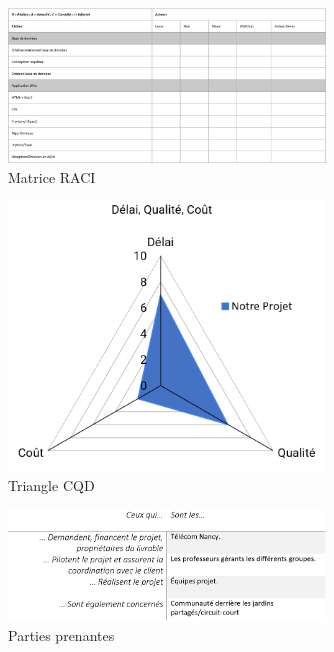 \documentclass[french,a4paper]{article}
\begin{document}
\begin{figure}[h]
    \centering
    \includegraphics[width=0.75\textwidth]{img/RACI.png}
    \caption{Matrice RACI}
    \label{fig:mesh1}
\end{figure}

\begin{figure}[h]
    \centering
    \includegraphics[width=0.75\textwidth]{img/triangle_QCD.png}
    \caption{Triangle CQD}
    \label{fig:mesh1}
\end{figure}

\begin{figure}[h]
    \centering
    \includegraphics[width=0.75\textwidth]{img/parties_prenantes.png}
    \caption{Parties prenantes}
    \label{fig:mesh1}
\end{figure}
\end{document}

